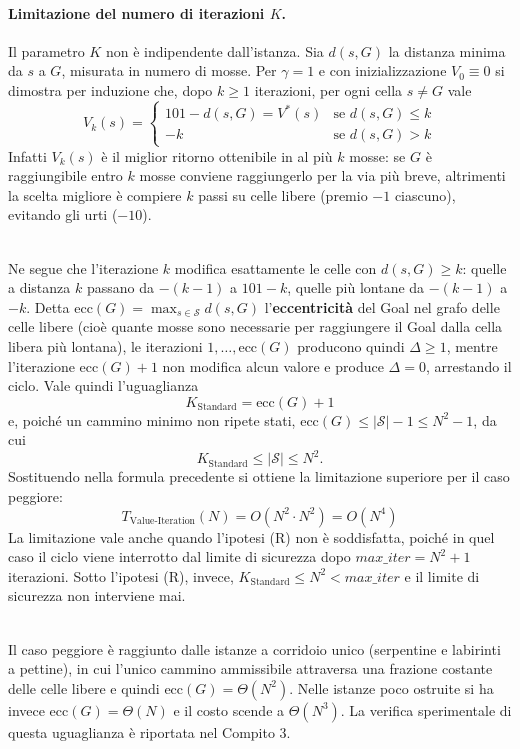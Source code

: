 \paragraph{Limitazione del numero di iterazioni $K$.}
Il parametro $K$ non è indipendente dall'istanza. Sia $d(s,G)$ la distanza minima da $s$ a $G$, misurata in numero di mosse. Per $\gamma = 1$ e con inizializzazione $V_0 \equiv 0$ si dimostra per induzione che, dopo $k \ge 1$ iterazioni, per ogni cella $s \ne G$ vale
\[
V_k(s) = \begin{cases}
101 - d(s,G) = V^*(s) & \text{se } d(s,G) \le k \\
-k & \text{se } d(s,G) > k
\end{cases}
\]
Infatti $V_k(s)$ è il miglior ritorno ottenibile in al più $k$ mosse: se $G$ è raggiungibile entro $k$ mosse conviene raggiungerlo per la via più breve, altrimenti la scelta migliore è compiere $k$ passi su celle libere (premio $-1$ ciascuno), evitando gli urti ($-10$).

\noindent\\
Ne segue che l'iterazione $k$ modifica esattamente le celle con $d(s,G) \ge k$: quelle a distanza $k$ passano da $-(k-1)$ a $101-k$, quelle più lontane da $-(k-1)$ a $-k$. Detta $\text{ecc}(G) = \max_{s \in \mathcal{S}} d(s, G)$ l'\textbf{eccentricità} del Goal nel grafo delle celle libere (cioè quante mosse sono necessarie per raggiungere il Goal dalla cella libera più lontana), le iterazioni $1, \dots, \text{ecc}(G)$ producono quindi $\Delta \ge 1$, mentre l'iterazione $\text{ecc}(G)+1$ non modifica alcun valore e produce $\Delta = 0$, arrestando il ciclo. Vale quindi l'uguaglianza
\[
K_{\text{Standard}} = \text{ecc}(G) + 1
\]
e, poiché un cammino minimo non ripete stati, $\text{ecc}(G) \le |\mathcal{S}| - 1 \le N^2 - 1$, da cui
\[
K_{\text{Standard}} \le |\mathcal{S}| \le N^2 .
\]
Sostituendo nella formula precedente si ottiene la limitazione superiore per il caso peggiore:
\[
T_{\text{Value-Iteration}}(N) = O(N^2 \cdot N^2) = O(N^4)
\]
La limitazione vale anche quando l'ipotesi (R) non è soddisfatta, poiché in quel caso il ciclo viene interrotto dal limite di sicurezza dopo $max\_iter = N^2 + 1$ iterazioni. Sotto l'ipotesi (R), invece, $K_{\text{Standard}} \le N^2 < max\_iter$ e il limite di sicurezza non interviene mai.

\noindent\\
Il caso peggiore è raggiunto dalle istanze a corridoio unico (serpentine e labirinti a pettine), in cui l'unico cammino ammissibile attraversa una frazione costante delle celle libere e quindi $\text{ecc}(G) = \Theta(N^2)$. Nelle istanze poco ostruite si ha invece $\text{ecc}(G) = \Theta(N)$ e il costo scende a $\Theta(N^3)$. La verifica sperimentale di questa uguaglianza è riportata nel Compito 3.

